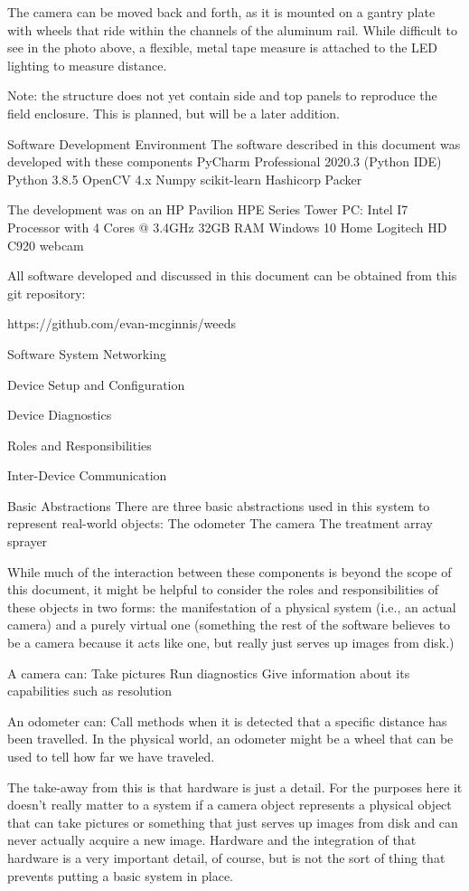 \documentclass[letterpaper]{article}
\begin{document}
The camera can be moved back and forth, as it is mounted on a gantry plate with wheels that ride within the channels of the aluminum rail.  While difficult to see in the photo above, a flexible, metal tape measure is attached to the LED lighting to measure distance.

Note: the structure does not yet contain side and top panels to reproduce the field enclosure. This is planned, but will be a later addition.

Software Development Environment
The software described in this document was developed with these components
PyCharm Professional 2020.3 (Python IDE)
Python 3.8.5
OpenCV 4.x
Numpy
scikit-learn
Hashicorp Packer

The development was on an HP Pavilion HPE Series Tower PC:
Intel I7 Processor with 4 Cores @ 3.4GHz
32GB RAM
Windows 10 Home
Logitech HD C920 webcam

All software developed and discussed in this document can be obtained from this git repository:

https://github.com/evan-mcginnis/weeds

Software System
Networking

Device Setup and Configuration

Device Diagnostics

Roles and Responsibilities

Inter-Device Communication

Basic Abstractions
There are three basic abstractions used in this system to represent real-world objects:
The odometer
The camera
The treatment array sprayer

While much of the interaction between these components is beyond the scope of this document, it might be helpful to consider the roles and responsibilities of these objects in two forms: the manifestation of a physical system (i.e., an actual camera) and a purely virtual one (something the rest of the software believes to be a camera because it acts like one, but really just serves up images from disk.)

A camera can:
Take pictures
Run diagnostics
Give information about its capabilities such as resolution

An odometer can:
Call methods when it is detected that a specific distance has been travelled. In the physical world, an odometer might be a wheel that can be used to tell how far we have traveled.

The take-away from this is that hardware is just a detail.  For the purposes here it doesn’t really matter to a system if a camera object represents a physical object that can take pictures or something that just serves up images from disk and can never actually acquire a new image. Hardware and the integration of that hardware is a very important detail, of course, but is not the sort of thing that prevents putting a basic system in place.
\end{document}
